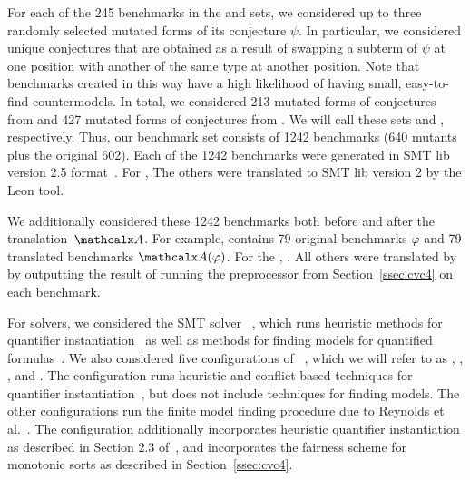 For each of the 245 benchmarks in the \isa and \leon sets, 
we considered up to three randomly selected
mutated forms of its conjecture $\psi$. In particular, we considered unique
conjectures that are obtained as a result of swapping a subterm of $\psi$ at
one position with another of the same type at another position.
Note that benchmarks created in this way have a high likelihood of having
small, easy-to-find countermodels. In total, we considered 213 mutated forms of
conjectures from \isa and 427 mutated forms of conjectures from \leon. We will
call these sets \isam and \leonm, respectively.
Thus, our benchmark set consists of 1242 benchmarks (640 mutants plus the
original 602). 
Each of the 1242 benchmarks were generated in SMT lib version 2.5 format~\cite{smtlib25}. %
For \isanun, 
The others were translated to SMT lib version 2 by the Leon tool.

We additionally considered these 1242 benchmarks both before and after the translation~$\conv$.
For example, \isa contains 79 original benchmarks $\varphi$ and 79 translated
benchmarks $\conv(\varphi)$.
For the \isanun, .
All others were translated by \cvc 
by outputting the result of running the preprocessor from Section~\ref{ssec:cvc4} on each benchmark.

For solvers, we considered the SMT solver \ziii~\cite{de-moura-bjoerner-2008},
which runs heuristic methods for quantifier instantiation~\cite{MouraBjoerner07}
as well as methods for finding models for quantified formulas~\cite{GeDeM-CAV-09}.
We also considered five configurations of \cvc~\cite{barrett-et-al-2011},
which we will refer to as \cvcd, \cvcf, \cvcfe, and \cvcfm.
The configuration \cvcd runs heuristic 
and conflict-based techniques for quantifier instantiation~\cite{ReynoldsTinelliMoura14},
but does not include techniques for finding models.
The other configurations run the finite model
finding procedure due to Reynolds et al.\ \cite{ReyEtAl-1-RR-13,reynolds-et-al-2013}.
The configuration \cvcfe additionally incorporates heuristic quantifier instantiation as described in Section 2.3 of~\cite{reynolds-et-al-2013},
and \cvcfm incorporates the fairness scheme for monotonic sorts as described in Section~\ref{ssec:cvc4}.

